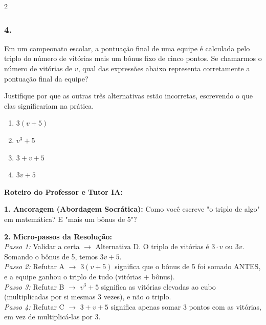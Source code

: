 \begin{multicols*}{2}
\subsubsection*{4.} 
\begin{enunciadoLiteral}
Em um campeonato escolar, a pontuação final de uma equipe é calculada pelo triplo do número de vitórias mais um bônus fixo de cinco pontos. Se chamarmos o número de vitórias de $v$, qual das expressões abaixo representa corretamente a pontuação final da equipe? 

Justifique por que as outras três alternativas estão incorretas, escrevendo o que elas significariam na prática.

\begin{enumerate}[label=\alph*), itemsep=\espacoAlt]
    \item $ 3(v + 5) $
    \item $ v^3 + 5 $
    \item $ 3 + v + 5 $
    \item $ 3v + 5 $
\end{enumerate}
\end{enunciadoLiteral}

\ifgabarito
    \begin{tcolorbox}[colback=CorTitUm!5, colframe=CorTitUm, boxrule=1pt, arc=4pt, left=6pt, right=6pt, top=6pt, bottom=6pt]
    \small\textbf{\textcolor{CorTitUm}{Roteiro do Professor e Tutor IA:}}\par\vspace{0.1cm}
    \color{CinzaEscuro}
    \textbf{1. Ancoragem (Abordagem Socrática):} Como você escreve "o triplo de algo" em matemática? E "mais um bônus de 5"?\par\vspace{0.1cm}
    
    \textbf{2. Micro-passos da Resolução:}\\
    \textit{Passo 1:} Validar a certa $\rightarrow$ Alternativa D. O triplo de vitórias é $3 \cdot v$ ou $3v$. Somando o bônus de 5, temos $3v + 5$.\\
    \textit{Passo 2:} Refutar A $\rightarrow$ $3(v+5)$ significa que o bônus de 5 foi somado ANTES, e a equipe ganhou o triplo de tudo (vitórias + bônus).\\
    \textit{Passo 3:} Refutar B $\rightarrow$ $v^3 + 5$ significa as vitórias elevadas ao cubo (multiplicadas por si mesmas 3 vezes), e não o triplo.\\
    \textit{Passo 4:} Refutar C $\rightarrow$ $3+v+5$ significa apenas somar 3 pontos com as vitórias, em vez de multiplicá-las por 3.\par\vspace{0.1cm}
    

\end{tcolorbox}
\end{multicols*}
